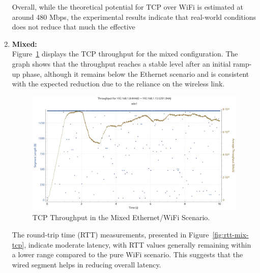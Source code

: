 \begin{enumerate}

                Overall, while the theoretical potential for TCP over WiFi is estimated at around 480 Mbps, the experimental results indicate that real-world conditions does not reduce that much the effective

            \vspace{0.2cm} %

            \item \textbf{Mixed:} \\
                Figure~\ref{fig:throughput-mix-tcp} displays the TCP throughput for the mixed configuration. 
                The graph shows that the throughput reaches a stable level after an initial ramp-up phase, although it remains below the Ethernet scenario and is consistent with the expected reduction due to the reliance on the wireless link.

                \begin{figure}[ht]
                    \centering
                    \includegraphics[width=0.9\columnwidth]{images/graphs/Throughput/Throughput_MIX_TCP.pdf}
                    \caption{TCP Throughput in the Mixed Ethernet/WiFi Scenario.}
                    \label{fig:throughput-mix-tcp}
                \end{figure}

                The round-trip time (RTT) measurements, presented in Figure~\ref{fig:rtt-mix-tcp}, indicate moderate latency, with RTT values generally remaining within a lower range compared to the pure WiFi scenario. 
                This suggests that the wired segment helps in reducing overall latency.


\end{enumerate}
